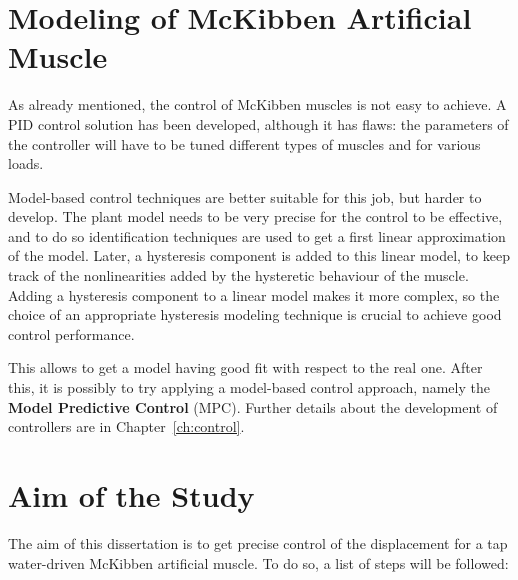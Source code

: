 \section{Modeling of McKibben Artificial Muscle}

As already mentioned, the control of McKibben muscles is not easy to achieve.
A PID control solution has been developed, although it has flaws:
the parameters of the controller will have to be tuned different types of muscles
and for various loads. 

Model-based control techniques are better suitable for this job,
but harder to develop. The plant model needs to be very precise
for the control to be effective, and to do so identification techniques
are used to get a first linear approximation of the model.
Later, a hysteresis component is added to this linear model, to keep track of the
nonlinearities added by the hysteretic behaviour of the muscle.
Adding a hysteresis component to a linear model makes it more complex, 
so the choice of an appropriate hysteresis modeling technique is crucial to achieve
good control performance.

This allows to get a model having good fit with respect to the real one.
After this, it is possibly to try applying a model-based control approach,
namely the \textbf{Model Predictive Control} (MPC).
Further details about the development of controllers are in Chapter~\ref{ch:control}.

\section{Aim of the Study}

The aim of this dissertation is to get precise control of the displacement for
a tap water-driven McKibben artificial muscle. To do so, a list of steps will be followed:

